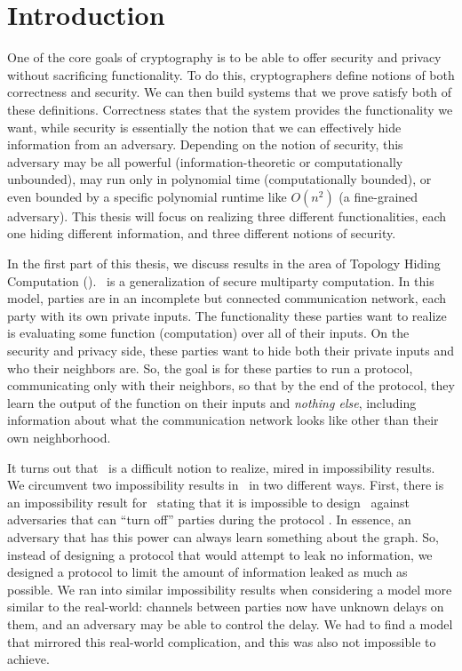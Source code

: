 
\chapter{Introduction}

One of the core goals of cryptography is to be able to offer security and privacy without sacrificing functionality.
To do this, cryptographers define notions of both correctness and security. We can then build systems that we prove satisfy both of these definitions. Correctness states that the system provides the functionality we want, while security is essentially the notion that we can effectively hide information from an adversary. Depending on the notion of security, this adversary may be all powerful (information-theoretic or computationally unbounded), may run only in polynomial time (computationally bounded), or even bounded by a specific polynomial runtime like $O(n^2)$ (a fine-grained adversary). This thesis will focus on realizing three different functionalities, each one hiding different information, and three different notions of security.

In the first part of this thesis, we discuss results in the area of Topology Hiding Computation (\THC). \THC~is a generalization of secure multiparty computation. In this model, parties are in an incomplete but connected communication network, each party with its own private inputs. The functionality these parties want to realize is evaluating some function (computation) over all of their inputs. On the security and privacy side, these parties want to hide both their private inputs and who their neighbors are.
So, the goal is for these parties to run a protocol, communicating only with their neighbors, so that by the end of the protocol, they learn the output of the function on their inputs and \emph{nothing else}, including information about what the communication network looks like other than their own neighborhood.

It turns out that \THC~is a difficult notion to realize, mired in impossibility results.
We circumvent two impossibility results in \THC~in two different ways. First, there is an impossibility result for \THC~stating that it is impossible to design \THC~against adversaries that can ``turn off'' parties during the protocol \cite{MOR15}. In essence, an adversary that has this power can always learn something about the graph. So, instead of designing a protocol that would attempt to leak no information, we designed a protocol to limit the amount of information leaked as much as possible. We ran into similar impossibility results when considering a model more similar to the real-world: channels between parties now have unknown delays on them, and an adversary may be able to control the delay. We had to find a model that mirrored this real-world complication, and this was also not impossible to achieve.

